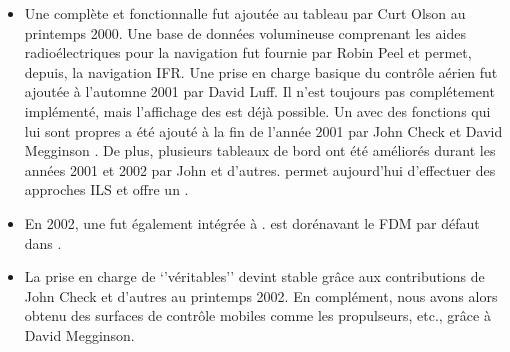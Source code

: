 {\begin{itemize}
\JSBSim, comme il fut appel\'{e} par la suite, rempla\c{c}a LaRCsim comme  () par d\'{e}faut,
 et il est pr\'{e}vu d'ajouter des fonctionnalit\'{e}s comme les effets d\^{u}s de car\`{e}ne dus au carburant, la turbulence, des syst\`{e}mes complets de contr\^{o}le du vol,
 et d'autres fonctionnalit\'{e}s g\'{e}n\'{e}ralement non pr\'{e}sentes ensembles dans un simulateur de vol. Comme alternative,
 Andy Ross ajouta un autre mod\`{e}le de dynamique de vol appel\'{e} \YASim{} (Yet Another Flight Dynamics Simulator, encore
 un autre simulateur de dynamique de vol), qui a pour but de pouvoir \^{e}tre utilis\'{e} faciliment, en s'appuyant sur la dynamique des fluides, fin 2001.
 Il nous permit d'obtenir des mod\`{e}les de vol pour un 747, un A4 et un DC-3. Alternativement, un groupe form\'{e} autour de
 Michael Selig du group  fournit un autre mod\`{e}le de vol avec d'autres a\'{e}ronefs autour de l'ann\'{e}e 2000.
\item Une  compl\`{e}te et fonctionnalle fut ajout\'{e}e au tableau par Curt Olson au printemps 2000. Une base de donn\'{e}es volumineuse comprenant
 les aides radio\'{e}lectriques pour la navigation fut fournie par Robin Peel et permet, depuis, la navigation IFR.
 Une prise en charge basique du contr\^{o}le a\'{e}rien  fut ajout\'{e}e \`{a} l'automne 2001 par David Luff. Il n'est toujours pas compl\'{e}tement impl\'{e}ment\'{e},
 mais l'affichage des  est d\'{e}j\`{a} possible. Un  avec des fonctions qui lui sont
 propres a \'{e}t\'{e} ajout\'{e} \`{a} la fin de l'ann\'{e}e 2001 par John Check et David Megginson . De plus, plusieurs tableaux de bord ont \'{e}t\'{e}
 am\'{e}lior\'{e}s durant les ann\'{e}es 2001 et 2002 par John et d'autres. \FlightGear{} permet aujourd'hui d'effectuer des approches ILS et offre un .
\item En 2002, une  fut \'{e}galement int\'{e}gr\'{e}e \`{a} \FlightGear{}. \JSBSim{} est dor\'{e}navant le FDM par d\'{e}faut dans \FlightGear{}.
\item La prise en charge de `'v\'{e}ritables''  devint stable gr\^{a}ce aux contributions de John Check et d'autres au printemps 2002.
 En compl\'{e}ment, nous avons alors obtenu des surfaces de contr\^{o}le mobiles  comme les
 propulseurs, etc., gr\^{a}ce \`{a} David Megginson.
\end{itemize}
}{}
\fi
\ifchinese
